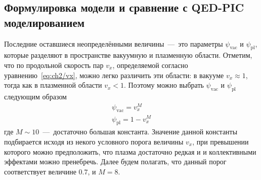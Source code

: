 \subsection{Формулировка модели и сравнение с QED-PIC моделированием}
\label{sub:ch2/sec3/Discussion}

Последние оставшиеся неопределёнными величины~---~это параметры $\psi_\mathrm{vac}$ и $\psi_\mathrm{pl}$, которые разделяют в пространстве вакуумную и плазменную области.
Отметим, что по продольной скорость пар $v_x$, определяемой согласно уравнению~\eqref{eq:ch2/vx}, можно легко различить эти области: в вакууме $v_x\approx 1$, тогда как в плазменной области $v_x < 1$.
Поэтому можно выбрать $\psi_\mathrm{vac}$ и $\psi_\mathrm{pl}$ следующим образом
\begin{gather}
    \psi_\mathrm{vac} = v_x^M \\
    \psi_\mathrm{pl} =  1 - v_x^M
\end{gather}
где $M\sim 10$~---~достаточно большая константа.
Значение данной константы подбирается исходя из некого условного порога величины $v_x$, при превышении которого можно предположить, что плазма достаточно редкая и и коллективными эффектами можно пренебречь.
Далее будем полагать, что данный порог соответствует величине $0.7$, и $M=8$.

